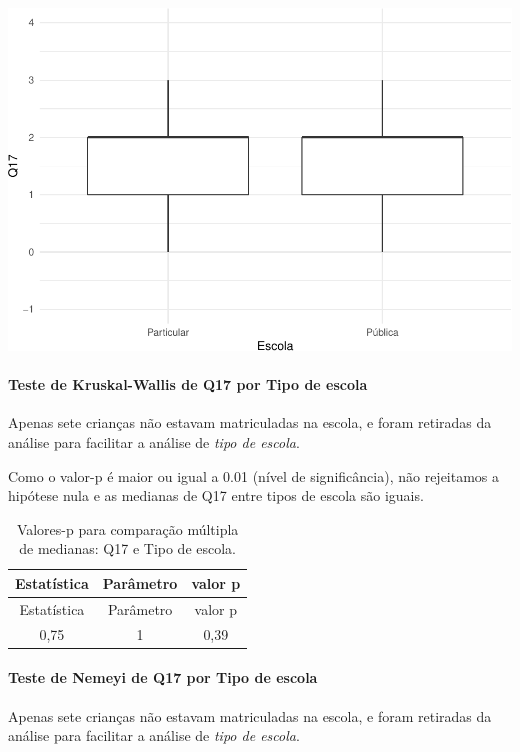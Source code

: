 \documentclass[]{article}
\let\oldparagraph\paragraph
\renewcommand{\paragraph}[1]{\oldparagraph{#1}\mbox{}}
\begin{document}
\begin{center}\includegraphics[width=0.75\linewidth]{relatorio_covid19_files/figure-latex/unnamed-chunk-234-1} \end{center}

\hypertarget{teste-de-kruskal-wallis-de-q17-por-tipo-de-escola}{%
\paragraph{Teste de Kruskal-Wallis de Q17 por Tipo de escola}\label{teste-de-kruskal-wallis-de-q17-por-tipo-de-escola}}

Apenas sete crianças não estavam matriculadas na escola, e foram retiradas da análise para facilitar a análise de \emph{tipo de escola}.

Como o valor-p é maior ou igual a 0.01 (nível de significância), não rejeitamos a hipótese nula e as medianas de Q17 entre tipos de escola são iguais.

\begin{longtable}[]{@{}ccc@{}}
\caption{\label{tab:unnamed-chunk-236}Valores-p para comparação múltipla de medianas: Q17 e Tipo de escola.}\tabularnewline
\toprule
Estatística & Parâmetro & valor p\tabularnewline
\midrule
\endfirsthead
\toprule
Estatística & Parâmetro & valor p\tabularnewline
\midrule
\endhead
0,75 & 1 & 0,39\tabularnewline
\bottomrule
\end{longtable}

\hypertarget{teste-de-nemeyi-de-q17-por-tipo-de-escola}{%
\paragraph{Teste de Nemeyi de Q17 por Tipo de escola}\label{teste-de-nemeyi-de-q17-por-tipo-de-escola}}

Apenas sete crianças não estavam matriculadas na escola, e foram retiradas da análise para facilitar a análise de \emph{tipo de escola}.
\end{document}
